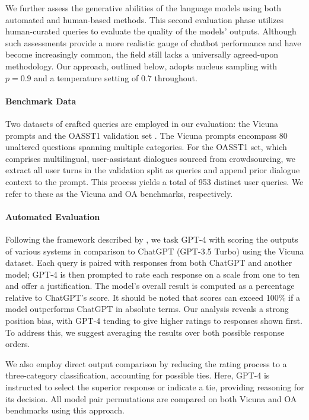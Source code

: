 We further assess the generative abilities of the language models using both automated and human-based methods. This second evaluation phase utilizes human-curated queries to evaluate the quality of the models' outputs. Although such assessments provide a more realistic gauge of chatbot performance and have become increasingly common, the field still lacks a universally agreed-upon methodology. Our approach, outlined below, adopts nucleus sampling with $p=0.9$ and a temperature setting of $0.7$ throughout.

\paragraph{Benchmark Data} Two datasets of crafted queries are employed in our evaluation: the Vicuna prompts \citep{vicuna2023} and the OASST1 validation set \citep{kopf2023openassistant}. The Vicuna prompts encompass 80 unaltered questions spanning multiple categories. For the OASST1 set, which comprises multilingual, user-assistant dialogues sourced from crowdsourcing, we extract all user turns in the validation split as queries and append prior dialogue context to the prompt. This process yields a total of 953 distinct user queries. We refer to these as the Vicuna and OA benchmarks, respectively.

\paragraph{Automated Evaluation} Following the framework described by \citet{vicuna2023}, we task GPT-4 with scoring the outputs of various systems in comparison to ChatGPT (GPT-3.5 Turbo) using the Vicuna dataset. Each query is paired with responses from both ChatGPT and another model; GPT-4 is then prompted to rate each response on a scale from one to ten and offer a justification. The model’s overall result is computed as a percentage relative to ChatGPT’s score. It should be noted that scores can exceed 100\% if a model outperforms ChatGPT in absolute terms. Our analysis reveals a strong position bias, with GPT-4 tending to give higher ratings to responses shown first. To address this, we suggest averaging the results over both possible response orders.

We also employ direct output comparison by reducing the rating process to a three-category classification, accounting for possible ties. Here, GPT-4 is instructed to select the superior response or indicate a tie, providing reasoning for its decision. All model pair permutations are compared on both Vicuna and OA benchmarks using this approach.


